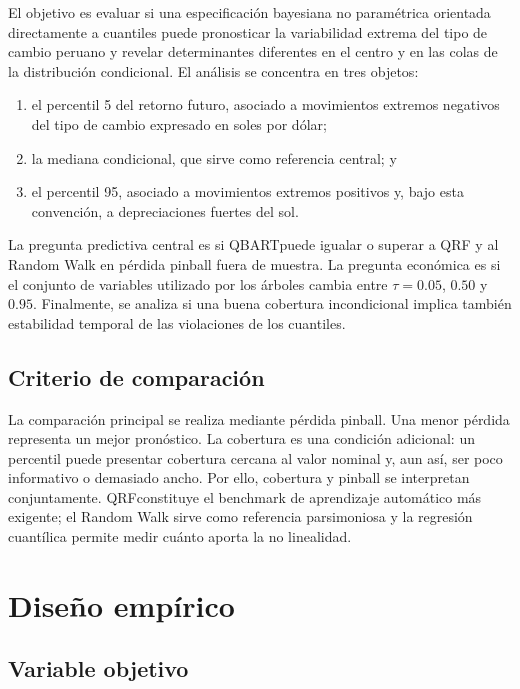 \documentclass[11pt,a4paper]{article}
\newcommand{\qbart}{\textsc{QBART}}
\newcommand{\qrf}{\textsc{QRF}}
\begin{document}
El objetivo es evaluar si una especificación bayesiana no paramétrica
orientada directamente a cuantiles puede pronosticar la variabilidad extrema
del tipo de cambio peruano y revelar determinantes diferentes en el centro y
en las colas de la distribución condicional. El análisis se concentra en
tres objetos:

\begin{enumerate}[leftmargin=*]
  \item el percentil 5 del retorno futuro, asociado a movimientos extremos
  negativos del tipo de cambio expresado en soles por dólar;
  \item la mediana condicional, que sirve como referencia central; y
  \item el percentil 95, asociado a movimientos extremos positivos y, bajo
  esta convención, a depreciaciones fuertes del sol.
\end{enumerate}

La pregunta predictiva central es si \qbart puede igualar o superar a \qrf
y al Random Walk en pérdida pinball fuera de muestra. La pregunta económica
es si el conjunto de variables utilizado por los árboles cambia entre
\(\tau=0.05\), \(0.50\) y \(0.95\). Finalmente, se analiza si una buena
cobertura incondicional implica también estabilidad temporal de las
violaciones de los cuantiles.

\subsection{Criterio de comparación}

La comparación principal se realiza mediante pérdida pinball. Una menor
pérdida representa un mejor pronóstico. La cobertura es una condición
adicional: un percentil puede presentar cobertura cercana al valor nominal
y, aun así, ser poco informativo o demasiado ancho. Por ello, cobertura y
pinball se interpretan conjuntamente. \qrf constituye el benchmark de
aprendizaje automático más exigente; el Random Walk sirve como referencia
parsimoniosa y la regresión cuantílica permite medir cuánto aporta la
no linealidad.

\section{Diseño empírico}

\subsection{Variable objetivo}
\end{document}
